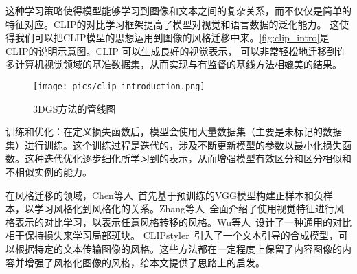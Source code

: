 这种学习策略使得模型能够学习到图像和文本之间的复杂关系，而不仅仅是简单的特征对应。CLIP的对比学习框架提高了模型对视觉和语言数据的泛化能力。
这使得我们可以把CLIP模型的思想运用到图像的风格迁移中来。\autoref{fig:clip_intro}是CLIP的说明示意图。CLIP 可以生成良好的视觉表示，
可以非常轻松地迁移到许多计算机视觉领域的基准数据集，从而实现与有监督的基线方法相媲美的结果。
\begin{figure}[htbp]
    \centering
    \texttt{[image: pics/clip\_introduction.png]}
    \caption{\label{fig:clip_intro}3DGS方法的管线图}
\end{figure}
\par 训练和优化：在定义损失函数后，模型会使用大量数据集（主要是未标记的数据集）进行训练。这个训练过程是迭代的，涉及不断更新模型的参数以最小化损失函数。这种迭代优化逐步细化所学习到的表示，从而增强模型有效区分和区分相似和不相似实例的能力。
\par 在风格迁移的领域，Chen等人~\cite{chen2021artistic}首先基于预训练的VGG模型构建正样本和负样本，以学习风格化到风格化的关系。Zhang等人~\cite{zhang2022domain}全面介绍了使用视觉特征进行风格表示的对比学习，以表示任意风格转移的风格。Wu等人~\cite{wu2022ccpl}设计了一种通用的对比相干保持损失来学习局部斑块。
CLIPstyler~\cite{kwon2022clipstyler}引入了一个文本引导的合成模型，可以根据特定的文本传输图像的风格。这些方法都在一定程度上保留了内容图像的内容并增强了风格化图像的风格，给本文提供了思路上的启发。


